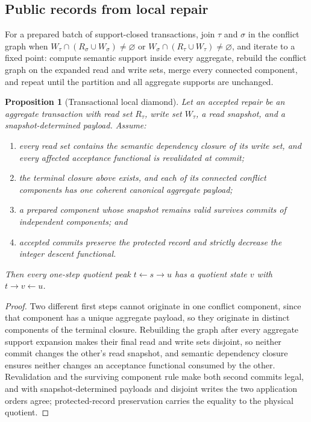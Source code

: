 \documentclass[11pt]{article}
\newtheorem{proposition}[theorem]{Proposition}
\theoremstyle{definition}
\theoremstyle{remark}
\begin{document}
\subsection{Public records from local repair}

For a prepared batch of support-closed transactions, join $\tau$ and $\sigma$
in the conflict graph when
$W_\tau\cap(R_\sigma\cup W_\sigma)\ne\varnothing$ or
$W_\sigma\cap(R_\tau\cup W_\tau)\ne\varnothing$, and iterate to a fixed
point: compute semantic support inside every aggregate, rebuild the conflict
graph on the expanded read and write sets, merge every connected component,
and repeat until the partition and all aggregate supports are unchanged.

\begin{proposition}[Transactional local diamond]
\label{prop:transactional-diamond}
Let an accepted repair be an aggregate transaction with read set $R_\tau$,
write set $W_\tau$, a read snapshot, and a snapshot-determined payload.
Assume:
\begin{enumerate}[label=(\roman*),leftmargin=1.6em]
\item every read set contains the semantic dependency closure of its write
set, and every affected acceptance functional is revalidated at commit;
\item the terminal closure above exists, and each of its connected conflict
components has one coherent canonical aggregate payload;
\item a prepared component whose snapshot remains valid survives commits of
independent components; and
\item accepted commits preserve the protected record and strictly decrease
the integer descent functional.
\end{enumerate}
Then every one-step quotient peak $t\longleftarrow s\longrightarrow u$ has a
quotient state $v$ with $t\longrightarrow v\longleftarrow u$.
\end{proposition}

\begin{proof}
Two different first steps cannot originate in one conflict component, since
that component has a unique aggregate payload, so they originate in distinct
components of the terminal closure. Rebuilding the graph after every
aggregate support expansion makes their final read and write sets disjoint,
so neither commit changes the other's read snapshot, and semantic dependency
closure ensures neither changes an acceptance functional consumed by the
other. Revalidation and the surviving component rule make both second
commits legal, and with snapshot-determined payloads and disjoint writes the
two application orders agree; protected-record preservation carries the
equality to the physical quotient.
\end{proof}
\end{document}
